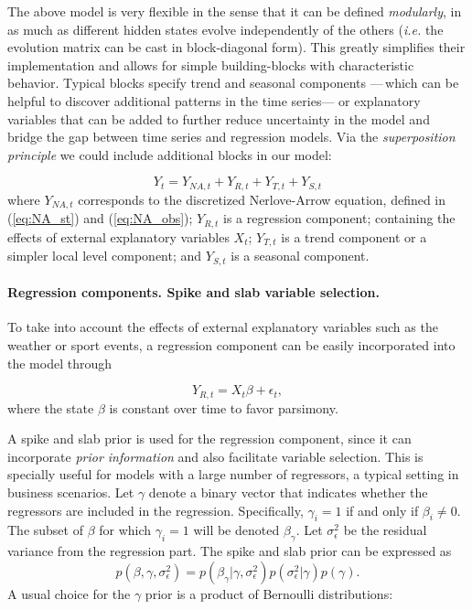 The above model is very flexible in the sense that it can be defined \emph{modularly},  in as much as different hidden states evolve independently of the others (\emph{i.e.} the evolution matrix can be cast in block-diagonal form). This greatly simplifies their implementation and allows for simple building-blocks with characteristic behavior. Typical blocks specify trend and seasonal components ---\,which can be helpful to discover additional patterns in the time series--- or explanatory variables that can be added to further reduce  uncertainty in the model and bridge the gap between time series and regression models. Via the \emph{superposition principle} \parencite[Chapter 3]{petris2009dynamic} we could include additional blocks in our model:

$$
Y_t = Y_{NA, t} + Y_{R, t} + Y_{T, t} + Y_{S, t}
$$
where $Y_{NA, t}$ corresponds to the discretized Nerlove-Arrow equation, defined in (\ref{eq:NA_st}) and (\ref{eq:NA_obs}); $Y_{R, t}$ is a regression component; containing the effects of  external explanatory variables $X_t$; $Y_{T, t}$ is a trend component or a simpler local level component; and $Y_{S, t}$ is a seasonal component.

\paragraph{Regression components. Spike and slab variable selection.}\label{sec:s_s}

To take into account the effects of external explanatory variables such as the weather or sport events, a  regression component can be easily incorporated into the model through

$$
Y_{R,t} = X_t \beta + \epsilon_t,
$$
where the state $\beta$ is constant over time to favor parsimony.

A spike and slab prior \parencite{mitchell1988bayesian} is used for the  regression component, since it can incorporate \emph{prior information} and also facilitate variable selection. This is specially useful for models with a large number of regressors, a typical setting in business scenarios.
Let $\gamma$ denote a binary vector that indicates whether the regressors are included in the regression. Specifically, $\gamma_i = 1$ if and only if $\beta_i \neq 0$. The subset of $\beta$ for which $\gamma_i = 1$ will be denoted $\beta_{\gamma}$. Let $\sigma^2_{\epsilon}$ be the residual variance from the regression part. The spike and slab prior \parencite{george1997approaches} can be expressed as
$$
p(\beta, \gamma, \sigma^2_{\epsilon}) = p(\beta_{\gamma} | \gamma, \sigma^2_{\epsilon})p(\sigma^2_{\epsilon} | \gamma)p(\gamma).
$$
A usual choice for the $\gamma$ prior is a product of Bernoulli distributions:

